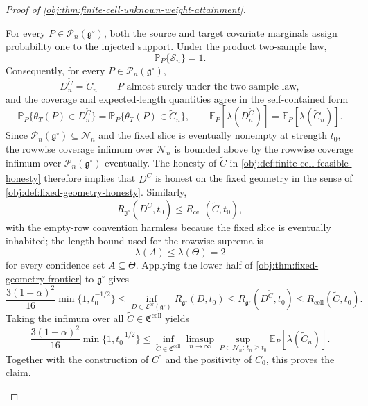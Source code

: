 \documentclass[11pt]{article}
\begin{document}
\begin{proof}[Proof of \cref{obj:thm:finite-cell-unknown-weight-attainment}]
\begin{enumerate}
For every \(P\in\mathcal P_n(\mathfrak g^\circ)\), both the source and target covariate marginals assign probability one to the injected support.  Under the product two-sample law,
\[
\mathbb P_P\{\mathcal S_n\}=1.
\]
Consequently, for every \(P\in\mathcal P_n(\mathfrak g^\circ)\),
\[
D^{\widetilde C}_n=\widetilde C_n
\qquad
P\text{-almost surely under the two-sample law},
\]
and the coverage and expected-length quantities agree in the self-contained form
\[
\mathbb P_P\{\theta_T(P)\in D^{\widetilde C}_n\}
=
\mathbb P_P\{\theta_T(P)\in \widetilde C_n\},
\qquad
\mathbb E_P[\lambda(D^{\widetilde C}_n)]
=
\mathbb E_P[\lambda(\widetilde C_n)].
\]
Since \(\mathcal P_n(\mathfrak g^\circ)\subseteq\mathcal N_n\) and the fixed slice is eventually nonempty at strength \(t_0\), the rowwise coverage infimum over \(\mathcal N_n\) is bounded above by the rowwise coverage infimum over \(\mathcal P_n(\mathfrak g^\circ)\) eventually.  The honesty of \(\widetilde C\) in \cref{obj:def:finite-cell-feasible-honesty} therefore implies that \(D^{\widetilde C}\) is honest on the fixed geometry in the sense of \cref{obj:def:fixed-geometry-honesty}.  Similarly,
\[
R_{\mathfrak g^\circ}(D^{\widetilde C},t_0)
\le
R_{\mathrm{cell}}(\widetilde C,t_0),
\]
with the empty-row convention harmless because the fixed slice is eventually inhabited; the length bound used for the rowwise suprema is
\[
\lambda(A)\le\lambda(\Theta)=2
\]
for every confidence set \(A\subseteq\Theta\).
Applying the lower half of \cref{obj:thm:fixed-geometry-frontier} to \(\mathfrak g^\circ\) gives
\[
\frac{3(1-\alpha)^2}{16}\min\{1,t_0^{-1/2}\}
\le
\inf_{D\in\mathfrak C^{\mathrm{or}}(\mathfrak g^\circ)}
R_{\mathfrak g^\circ}(D,t_0)
\le
R_{\mathfrak g^\circ}(D^{\widetilde C},t_0)
\le
R_{\mathrm{cell}}(\widetilde C,t_0).
\]
Taking the infimum over all
\(\widetilde C\in\mathfrak C^{\mathrm{cell}}\) yields
\[
\frac{3(1-\alpha)^2}{16}\min\{1,t_0^{-1/2}\}
\le
\inf_{\widetilde C\in\mathfrak C^{\mathrm{cell}}}
\limsup_{n\to\infty}
\sup_{P\in\mathcal N_n:\,t_n\ge t_0}
\mathbb E_P[\lambda(\widetilde C_n)].
\]
Together with the construction of \(C^\circ\) and the positivity of \(C_0\), this proves the claim.
\end{enumerate}
\end{proof}
\end{document}
